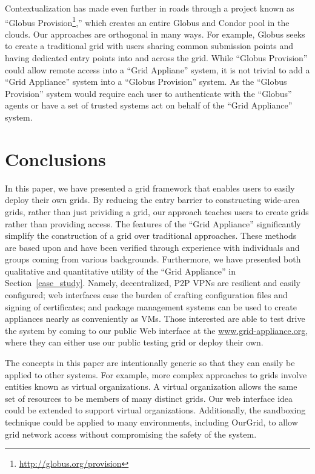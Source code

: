\documentclass[twocolumn]{svjour3}
\begin{document}
Contextualization has made even further in roads through a project known as
``Globus Provision\footnote{\url{http://globus.org/provision}},'' which creates
an entire Globus and Condor pool in the clouds.  Our approaches are orthogonal
in many ways.  For example, Globus seeks to create a traditional grid with
users sharing common submission points and having dedicated entry points into
and across the grid.   While ``Globus Provision'' could allow remote access
into a ``Grid Appliane'' system, it is not trivial to add a ``Grid Appliance''
system into a ``Globus Provision'' system.  As the ``Globus Provision'' system
would require each user to authenticate with the ``Globus'' agents or have a
set of trusted systems act on behalf of the ``Grid Appliance'' system.

\section{Conclusions}
\label{conclusions}

In this paper, we have presented a grid framework that enables users to easily
deploy their own grids.  By reducing the entry barrier to constructing
wide-area grids, rather than just prividing a grid, our approach teaches users
to create grids rather than providing access.  The features of the ``Grid
Appliance'' significantly simplify the construction of a grid over traditional
approaches.  These methods are based upon and have been verified through
experience with individuals and groups coming from various backgrounds.
Furthermore, we have presented both qualitative and quantitative utility of the
``Grid Appliance'' in Section~\ref{case_study}.  Namely, decentralized, P2P
VPNs are resilient and easily configured; web interfaces ease the burden of
crafting configuration files and signing of certificates; and package
management systems can be used to create appliances nearly as conveniently as
VMs.  Those interested are able to test drive the system by coming to our
public Web interface at the \url{www.grid-appliance.org}, where they can either
use our public testing grid or deploy their own.

The concepts in this paper are intentionally generic so that they can easily be
applied to other systems.  For example, more complex approaches to grids
involve entities known as virtual organizations.  A virtual organization allows
the same set of resources to be members of many distinct grids.  Our web
interface idea could be extended to support virtual organizations.
Additionally, the sandboxing technique could be applied to many environments,
including OurGrid, to allow grid network access without compromising the safety
of the system.
\end{document}
